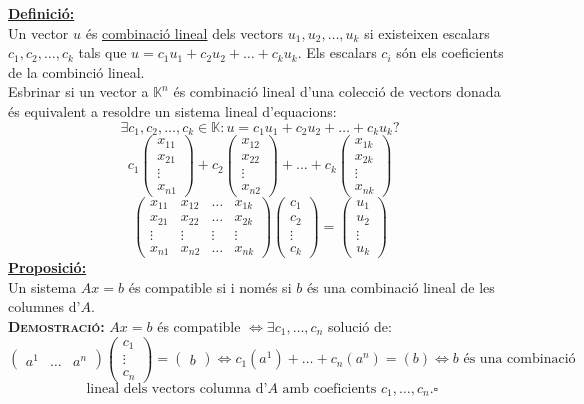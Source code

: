 \documentclass[11pt]{article}
\newcommand{\fieldk}{\mathbb{K}}
\newcommand{\definicio}{\underline{\textbf{Definició:}}\\}
\newcommand{\proposicio}{\underline{\textbf{Proposició:}}\\}
\newcommand{\demostracio}{\textbf{{\scshape Demostració: }}}
\begin{document}
\noindent \definicio Un vector $u$ és \underline{combinació lineal} dels vectors $u_1,u_2,\ldots,u_k$ si existeixen escalars $c_1,c_2,\ldots,c_k$ tals que $u=c_1u_1+c_2u_2+\ldots+c_ku_k$. Els escalars $c_i$ són els coeficients de la combinció lineal.\\
Esbrinar si un vector a $\fieldk^n$ és combinació lineal d'una colecció de vectors donada és equivalent a resoldre un sistema lineal d'equacions:
$$\exists c_1,c_2,\ldots,c_k\in\fieldk : u=c_1u_1+c_2u_2+\ldots+c_ku_k?$$
$$
c_1\left( \begin{array}{c}
x_{11} \\
x_{21} \\
\vdots \\
x_{n1} \end{array} \right)
+ c_2\left( \begin{array}{c}
x_{12} \\
x_{22} \\
\vdots \\
x_{n2} \end{array} \right)
+\ldots
+c_k \left( \begin{array}{c}
x_{1k} \\
x_{2k} \\
\vdots \\
x_{nk} \end{array} \right)
$$
$$
\left( \begin{array}{cccc}
x_{11} & x_{12} & \ldots & x_{1k} \\
x_{21} & x_{22} & \ldots & x_{2k} \\
\vdots & \vdots & \vdots & \vdots\\
x_{n1} & x_{n2} & \ldots & x_{nk} \end{array} \right)
\left( \begin{array}{c}
c_1 \\
c_2 \\
\vdots \\
c_k \end{array} \right)
=
\left( \begin{array}{c}
u_1 \\
u_2 \\
\vdots \\
u_k \end{array} \right)
$$
\proposicio Un sistema $Ax=b$ és compatible si i només si $b$ és una combinació lineal de les columnes d'$A$.\\
\demostracio $Ax=b$ és compatible $\iff\exists c_1,\ldots,c_n$ solució de:
$$
\left( \begin{array}{ccc}
a^1 & \ldots & a^n \end{array} \right)
\left( \begin{array}{c}
c_1 \\
\vdots \\
c_n \end{array} \right)
=
\left( \begin{array}{c}
b \end{array} \right)
\iff c_1(a^1)+\ldots+c_n(a^n)=(b)
\iff b \textrm{ és una combinació}
$$
$$\textrm{ lineal dels vectors columna d'}A\textrm{ amb coeficients }c_1,\ldots,c_n.\square$$
\end{document}
